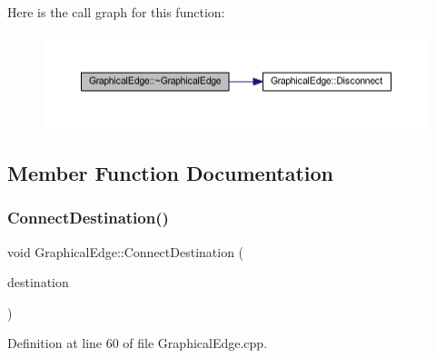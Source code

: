 Here is the call graph for this function\+:
\nopagebreak
\begin{figure}[H]
\begin{center}
\leavevmode
\includegraphics[width=350pt]{class_graphical_edge_ac19b4561ff4274f8fbbc6700a86b2f27_cgraph}
\end{center}
\end{figure}


\subsection{Member Function Documentation}
\mbox{\label{class_graphical_edge_a41868fd50c413744e61a549f1cef6a79}} 
\subsubsection{\texorpdfstring{Connect\+Destination()}{ConnectDestination()}}
{\footnotesize\ttfamily void Graphical\+Edge\+::\+Connect\+Destination (\begin{DoxyParamCaption}\item[{\hyperlink{class_graphical_node}{Graphical\+Node} $\ast$}]{destination }\end{DoxyParamCaption})}



Definition at line 60 of file Graphical\+Edge.\+cpp.


